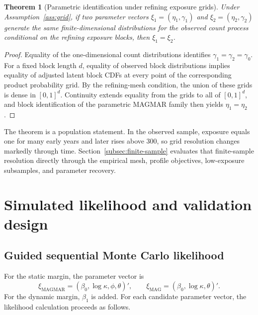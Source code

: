 \documentclass[11pt]{article}
\newtheorem{theorem}{Theorem}[section]
\theoremstyle{definition}
\begin{document}
\begin{theorem}[Parametric identification under refining exposure grids]
\label{thm:grid}
Under Assumption~\ref{ass:grid}, if two parameter vectors
$\xi_1=(\eta_1,\gamma_1)$ and $\xi_2=(\eta_2,\gamma_2)$ generate the same
finite-dimensional distributions for the observed count process conditional on the
refining exposure blocks, then $\xi_1=\xi_2$.
\end{theorem}

\begin{proof}
Equality of the one-dimensional count distributions identifies
$\gamma_1=\gamma_2=\gamma_0$. For a fixed block length $d$, equality of observed
block distributions implies equality of adjusted latent block CDFs at every point
of the corresponding product probability grid. By the refining-mesh condition, the
union of these grids is dense in $[0,1]^d$. Continuity extends equality from the
grids to all of $[0,1]^d$, and block identification of the parametric MAGMAR family
then yields $\eta_1=\eta_2$.
\end{proof}

The theorem is a population statement. In the observed sample, exposure equals one
for many early years and later rises above 300, so grid resolution changes markedly
through time. Section~\ref{subsec:finite-sample} evaluates that finite-sample
resolution directly through the empirical mesh, profile objectives, low-exposure
subsamples, and parameter recovery.

\section{Simulated likelihood and validation design}
\label{sec:estimation}

\subsection{Guided sequential Monte Carlo likelihood}

For the static margin, the parameter vector is
\[
\xi_{\mathrm{MAGMAR}}=(\beta_0,\log\kappa,\phi,\theta)',
\qquad
\xi_{\mathrm{MAG}}=(\beta_0,\log\kappa,\theta)'.
\]
For the dynamic margin, $\beta_1$ is added. For each candidate parameter vector,
the likelihood calculation proceeds as follows.
\end{document}
